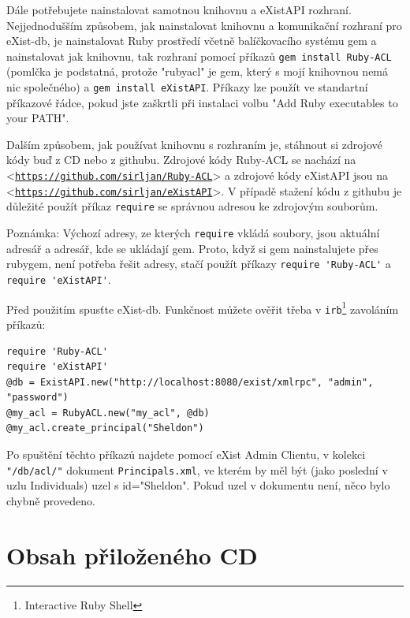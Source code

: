 \documentclass[11pt,twoside,a4paper]{book}
\let\oldUrl\url
\renewcommand\url[1]{<\texttt{\oldUrl{#1}}>}
\begin{document}
Dále potřebujete nainstalovat samotnou knihovnu a eXistAPI rozhraní.
Nejjednodušším způsobem, jak nainstalovat knihovnu a komunikační rozhraní pro eXist-db, je nainstalovat Ruby prostředí včetně balíčkovacího systému gem a nainstalovat jak knihovnu, tak rozhraní pomocí příkazů \verb|gem install Ruby-ACL| (pomlčka je podstatná, protože "rubyacl" je gem, který s mojí knihovnou nemá nic společného) a \verb|gem install eXistAPI|. Příkazy lze použít ve standartní příkazové řádce, pokud jste zaškrtli při instalaci volbu "Add Ruby executables to your PATH". 

Dalším způsobem, jak používat knihovnu s rozhraním je, stáhnout si zdrojové kódy buď z CD nebo z githubu. Zdrojové kódy Ruby-ACL se nachází na \url{https://github.com/sirljan/Ruby-ACL} a zdrojové kódy eXistAPI jsou na \url{https://github.com/sirljan/eXistAPI}. V případě stažení kódu z githubu je důležité použít příkaz \verb|require| se správnou adresou ke zdrojovým souborům. 

\noindent Poznámka: Výchozí adresy, ze kterých \verb|require| vkládá soubory, jsou aktuální adresář a adresář, kde se ukládají gem. Proto, když si gem nainstalujete přes rubygem, není potřeba řešit adresy, stačí použít příkazy \verb|require 'Ruby-ACL'| a \verb|require 'eXistAPI'|.

\noindent Před použitím spusťte eXist-db. Funkčnost můžete ověřit třeba v \verb|irb|\footnote{Interactive Ruby Shell} zavoláním příkazů:

\begin{verbatim}
require 'Ruby-ACL'
require 'eXistAPI'
@db = ExistAPI.new("http://localhost:8080/exist/xmlrpc", "admin", "password")
@my_acl = RubyACL.new("my_acl", @db)
@my_acl.create_principal("Sheldon")
\end{verbatim}

Po spuštění těchto příkazů najdete pomocí eXist Admin Clientu, v kolekci \verb|"/db/acl/"| dokument  \verb|Principals.xml|, ve kterém by měl být (jako poslední v uzlu Individuals) uzel s id="Sheldon". Pokud uzel v dokumentu není, něco bylo chybně provedeno.

\chapter{Obsah přiloženého CD}
\end{document}
